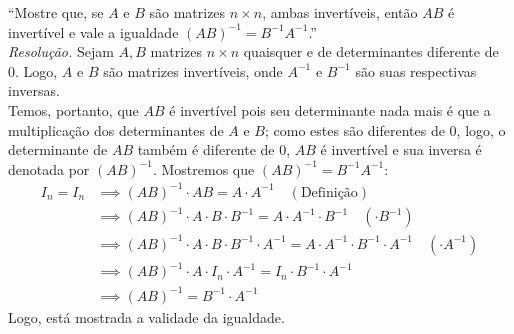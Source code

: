 \enquote{Mostre que, se $A$ e $B$ são matrizes $n \times n$, ambas invertíveis, então $AB$ é invertível e vale a igualdade $(AB)^{-1} = B^{-1}A^{-1}$.}
\\ 
\emph{Resolução.} Sejam $A, B$ matrizes $n \times n$ quaisquer e de determinantes diferente de 0. Logo, $A$ e $B$ são matrizes invertíveis, onde $A^{-1}$ e $B^{-1}$ são suas respectivas inversas. \\
Temos, portanto, que $AB$ é invertível pois seu determinante nada mais é que a multiplicação dos determinantes de $A$ e $B$; como estes são diferentes de 0, logo, o determinante de $AB$ também é diferente de 0, $AB$ é invertível e sua inversa é denotada por $(AB)^{-1}$. Mostremos que $(AB)^{-1} = B^{-1}A^{-1}$:
\begin{align*}
	I_n = I_n & \implies (AB)^{-1} \cdot AB = A \cdot A^{-1} \quad (\text{Definição}) \\ & \implies
    (AB)^{-1} \cdot A \cdot B \cdot B^{-1} = A \cdot A^{-1} \cdot B^{-1} \quad (\cdot B^{-1}) \\ & \implies
    (AB)^{-1} \cdot A \cdot B \cdot B^{-1} \cdot A^{-1} = A \cdot A^{-1} \cdot B^{-1} \cdot A^{-1} \quad (\cdot A^{-1}) \\ & \implies 
    (AB)^{-1} \cdot A \cdot I_n \cdot A^{-1} = I_n \cdot B^{-1} \cdot A^{-1} \\ & \implies
    (AB)^{-1} = B^{-1} \cdot A^{-1}
\end{align*}
Logo, está mostrada a validade da igualdade.